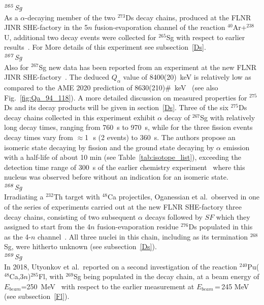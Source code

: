 {\it $^{\it265}$Sg}\\
As a $\alpha$-decaying member of the two $^{273}$Ds decay chains, produced at the FLNR JINR SHE-factory in the 5$n$ fusion-evaporation channel of the reaction $^{40}$Ar+$^{238}$U, additional two decay events were collected for $^{265}$Sg with respect to earlier results~\cite{Oganessian2024}. For More details of this experiment see subsection~\ref{Ds}.\\

{\it $^{\it267}$Sg}\\
Also for $^{267}$Sg new data has been reported from an experiment at the new FLNR JINR SHE-factory~\cite{Oganessian2024}.
The deduced $Q_\alpha$ value of 8400(20)~keV is relatively low as compared to the AME 2020 prediction of 8630(210)\#~keV~\cite{Wang2021} (see also Fig.~\ref{fig:Qa_94_118}).
A more detailed discussion on measured properties for $^{275}$Ds and its decay products will be given in section~\ref{Ds}. 
Three of the six $^{275}$Ds decay chains collected in this experiment exhibit $\alpha$ decay of $^{267}$Sg with relatively long decay times, ranging from 760~s to 970~s, while for the three fission events decay times vary from $\approx$1\,~s (2 events) to 360~s.  
The authors propose an isomeric state decaying by fission and the ground state decaying by $\alpha$ emission with a half-life of about 10 min (see Table~\ref{tab:isotope_list}), exceeding the detection time range of 300~s of the earlier chemistry experiment~\cite{Dvorak2006,Dvorak2008} where this nucleus was observed before without an indication for an isomeric state.\\

{\it $^{\it268}$Sg}\\
Irradiating a $^{232}$Th target with $^{48}$Ca projectiles, Oganessian et al.~observed in one of the series of experiments carried out at the new FLNR SHE-factory three decay chains, consisting of two subsequent $\alpha$ decays followed by $SF$ which they assigned to start from the 4$n$ fusion-evaporation residue $^{276}$Ds populated in this  as the 4-$n$ channel~\cite{Oganessian2023}. 
All three nuclei in this chain, including as its termination $^{268}$Sg, were hitherto unknown (see subsection~\ref{Ds}).\\

{\it $^{\it269}$Sg}\\
In 2018, Utyonkov et al.~reported on a second investigation of the reaction $^{240}$Pu($^{48}$Ca,$3n$)$^{285}$Fl, with $^{269}$Sg being populated in the decay chain, at a beam energy of $E_{beam}$=250~MeV~\cite{Utyonkov2018} with respect to the earlier measurement at $E_{beam}$\,=\,245 MeV (see subsection~\ref{Fl}).\\

